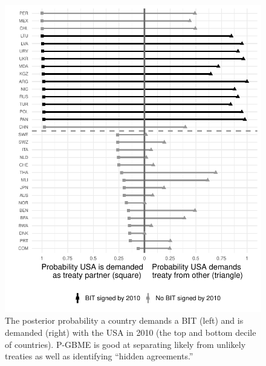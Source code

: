 \begin{figure}[ht]
	\centering
\includegraphics[width=.7\textwidth]{figure2.pdf} 
\caption{The posterior probability a country demands a BIT (left) and is demanded (right) with the USA in 2010 (the top and bottom decile of countries).  P-GBME is good at separating likely from unlikely treaties as well as identifying ``hidden agreements.''}	
	\label{fig:predplotUSA}
\end{figure}
\FloatBarrier
